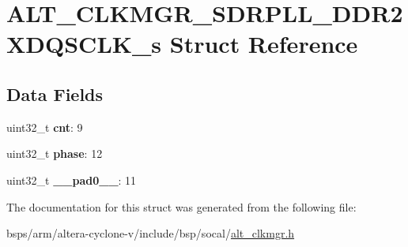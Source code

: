 \hypertarget{structALT__CLKMGR__SDRPLL__DDR2XDQSCLK__s}{}\section{A\+L\+T\+\_\+\+C\+L\+K\+M\+G\+R\+\_\+\+S\+D\+R\+P\+L\+L\+\_\+\+D\+D\+R2\+X\+D\+Q\+S\+C\+L\+K\+\_\+s Struct Reference}
\label{structALT__CLKMGR__SDRPLL__DDR2XDQSCLK__s}
\subsection*{Data Fields}
\begin{DoxyCompactItemize}
\item 
\mbox{\label{structALT__CLKMGR__SDRPLL__DDR2XDQSCLK__s_a4c546b34ca53e1bb5c82071bf3a2cd65}} 
uint32\+\_\+t {\bfseries cnt}\+: 9
\item 
\mbox{\label{structALT__CLKMGR__SDRPLL__DDR2XDQSCLK__s_a3dce0271d3e3512794a9ab4cb16fb149}} 
uint32\+\_\+t {\bfseries phase}\+: 12
\item 
\mbox{\label{structALT__CLKMGR__SDRPLL__DDR2XDQSCLK__s_ab16e34e4d3f0f76e5d62ba4e3f468675}} 
uint32\+\_\+t {\bfseries \+\_\+\+\_\+pad0\+\_\+\+\_\+}\+: 11
\end{DoxyCompactItemize}


The documentation for this struct was generated from the following file\+:\begin{DoxyCompactItemize}
\item 
bsps/arm/altera-\/cyclone-\/v/include/bsp/socal/\mbox{\hyperlink{alt__clkmgr_8h}{alt\+\_\+clkmgr.\+h}}\end{DoxyCompactItemize}
